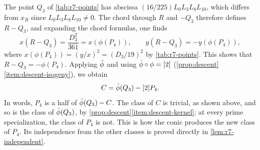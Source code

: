 The point $Q_3$ of \cref{tab:r7-points} has abscissa
$(16/225)L_0L_3L_8L_{10}$, which differs from $x_R$ since $L_0L_3L_8L_{10}\ne0$.
The chord through $R$ and $-Q_3$ therefore defines $R-Q_3$, and expanding
the chord formulas, one finds
\[
 x(R-Q_3)=\frac{D_3^2}{361}=x(\phi(P_4)),\qquad y(R-Q_3)=-y(\phi(P_4)),
\]
where $x(\phi(P_4))=(y/x)^2=(D_3/19)^2$ by \cref{tab:r7-points}. This shows that
$R-Q_3=-\phi(P_4)$. Applying $\hat\phi$ and using $\hat\phi\circ\phi=[2]$
(\cref{prop:descent}\ref{item:descent-isogeny}), we obtain
\[
 C=\hat\phi(Q_3)-[2]P_4.
\]
In words, $P_4$ is a half of $\hat\phi(Q_3)-C$. The class of $C$ is trivial,
as shown above, and so is the class of $\hat\phi(Q_3)$, by
\cref{prop:descent}\ref{item:descent-kernel}; at every prime
specialization, the class of $P_4$ is not.
This is how the conic produces the new class of $P_4$. Its
independence from the other classes is proved directly in
\cref{lem:r7-independent}.

